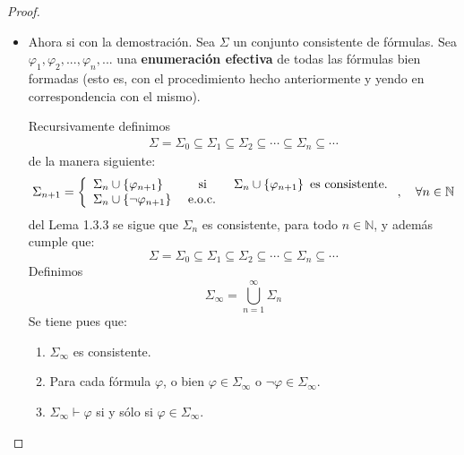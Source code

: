 \documentclass[12pt]{report}
\theoremstyle{largebreak}
\begin{document}
\begin{proof}
\begin{itemize}
            \item Ahora si con la demostración. Sea $\Sigma$ un conjunto consistente de fórmulas. Sea $\varphi_1,\varphi_2,...,\varphi_n,...$ una \textbf{enumeración efectiva} de todas las fórmulas bien formadas (esto es, con el procedimiento hecho anteriormente y yendo en correspondencia con el mismo).
            
            Recursivamente definimos
            \begin{equation*}
                \begin{split}
                    \Sigma=\Sigma_0\subseteq\Sigma_1\subseteq\Sigma_2\subseteq\cdots\subseteq\Sigma_n\subseteq\cdots
                \end{split}
            \end{equation*}
            de la manera siguiente:
            \begin{equation*}
                \Sigma_{ n+1}=\left\{
                    \begin{array}{lcr}
                        \Sigma_n\cup\left\{\varphi_{n+1}\right\} & \textup{ si } & \Sigma_n\cup\left\{\varphi_{n+1}\right\} \textup{ es consistente.}\\
                        \Sigma_n\cup\left\{\neg\varphi_{n+1}\right\} & \textup{ e.o.c. } & \\
                    \end{array}
                \right.,\quad\forall n\in\mathbb{N}
            \end{equation*}
            del Lema 1.3.3 se sigue que $\Sigma_n$ es consistente, para todo $n\in\mathbb{N}$, y además cumple que:
            \begin{equation*}
                \Sigma=\Sigma_0\subseteq\Sigma_1\subseteq\Sigma_2\subseteq\cdots\subseteq\Sigma_n\subseteq\cdots
            \end{equation*}
            Definimos
            \begin{equation*}
                \Sigma_{\infty}=\bigcup_{ n=1}^\infty\Sigma_n
            \end{equation*}
            Se tiene pues que:
            \begin{enumerate}
                \item $\Sigma_{\infty}$ es consistente.
                \item Para cada fórmula $\varphi$, o bien $\varphi\in\Sigma_\infty$ o $\neg\varphi\in\Sigma_{\infty}$.
                \item $\Sigma_\infty\vdash\varphi$ si y sólo si $\varphi\in\Sigma_{\infty}$.

\end{enumerate}
\end{itemize}
\end{proof}
\end{document}
